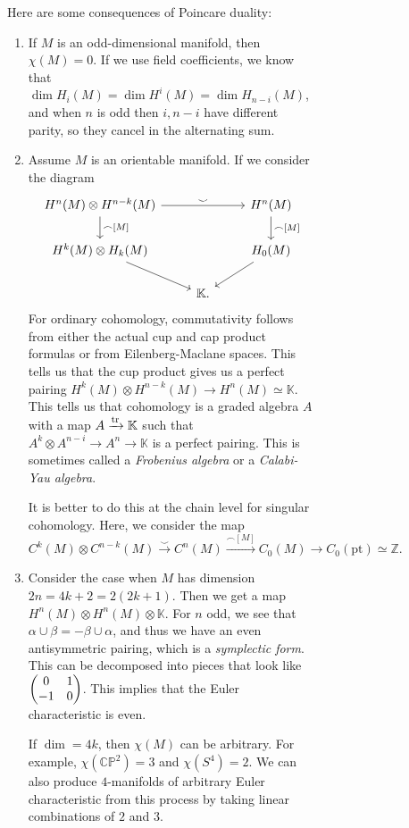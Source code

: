 \documentclass[leqno, openany]{memoir}
\theoremstyle{definition}
\theoremstyle{remark}
\theoremstyle{plain}
\theoremstyle{definition}
\theoremstyle{remark}
\newcommand{\C}{\mathbb{C}}
\newcommand{\Z}{\mathbb{Z}}
\renewcommand{\P}{\mathbb{P}}
\newcommand{\mr}[1]{\mathrm{#1}}
\begin{document}
\begin{figure}[H]
\begin{figure}[H]
Here are some consequences of Poincare duality: \begin{enumerate} \item If $M$
    is an odd-dimensional manifold, then $\chi(M) = 0$. If we use field
    coefficients, we know that $\dim H_i(M) = \dim H^i(M) = \dim H_{n-i}(M)$,
    and when $n$ is odd then $i, n-i$ have different parity, so they cancel in
    the alternating sum.  \item Assume $M$ is an orientable manifold. If we
    consider the diagram \begin{equation*} \begin{tikzcd} H^n(M) \otimes
        H^{n-k}(M) \arrow{rr}{\smile} \arrow{d}{\frown{[M]}} & & H^n(M)
        \arrow{d}{\frown {[M]}} \\ H^k(M) \otimes H_k(M) \arrow{dr} & & H_0(M)
        \arrow{dl} \\ & \mathbb{K}.  \end{tikzcd} \end{equation*} For ordinary
        cohomology, commutativity follows from either the actual cup and cap
        product formulas or from Eilenberg-Maclane spaces. This tells us that
        the cup product gives us a perfect pairing $H^k(M) \otimes H^{n-k}(M)
        \to H^n(M) \simeq \mathbb{K}$. This tells us that cohomology is a
        graded algebra $A$ with a map $A \xrightarrow{\tr} \mathbb{K}$ such
        that $A^k \otimes A^{n-i} \to A^n \to \mathbb{K}$ is a perfect pairing.
        This is sometimes called a \textit{Frobenius algebra} or a
        \textit{Calabi-Yau algebra}.  

    It is better to do this at the chain level for singular cohomology. Here,
    we consider the map \[ C^k(M) \otimes C^{n-k}(M) \xrightarrow{\smile}
    C^n(M) \xrightarrow{\frown{{[M]}}} C_0(M) \to C_0(\mr{pt}) \simeq \Z. \]
\item Consider the case when $M$ has dimension $2n = 4k+2 = 2(2k+1)$. Then we
    get a map $H^n(M) \otimes H^n(M) \otimes \mathbb{K}$. For $n$ odd, we see
    that $\alpha \cup \beta = - \beta \cup \alpha$, and thus we have an even
    antisymmetric pairing, which is a \textit{symplectic form}. This can be
    decomposed into pieces that look like $\mqty(0 & 1 \\ -1 & 0)$. This
    implies that the Euler characteristic is even.

    If $\dim = 4k$, then $\chi(M)$ can be arbitrary. For example, $\chi(\C\P^2)
    = 3$ and $\chi(S^4) = 2$. We can also produce $4$-manifolds of arbitrary
    Euler characteristic from this process by taking linear combinations of $2$
    and $3$.  \end{enumerate}


\end{figure}
\end{figure}
\end{document}
